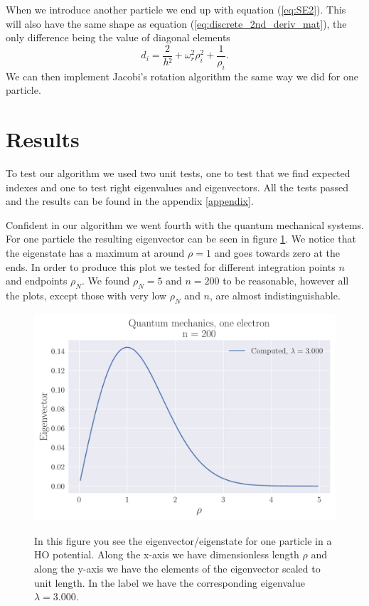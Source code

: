 \documentclass[reprint,english,notitlepage,nofootinbib]{revtex4-1}  %
\begin{document}
When we introduce another particle we end up with equation (\ref{eq:SE2}). This will also have the same shape as equation (\ref{eq:discrete_2nd_deriv_mat}), the only difference being the value of diagonal elements
\begin{equation*}
	d_i = \frac{2}{h²} + \omega_r^2\rho_i^2 + \frac{1}{\rho_i}.
\end{equation*}
We can then implement Jacobi's rotation algorithm the same way we did for one particle.

\section{Results}

To test our algorithm we used two unit tests, one to test that we find expected indexes and one to test right eigenvalues and eigenvectors. All the tests passed and the results can be found in the appendix \ref{appendix}. 

Confident in our algorithm we went fourth with the quantum mechanical systems. For one particle the resulting eigenvector can be seen in figure \ref{fig:QM200}. We notice that the eigenstate has a maximum at around $\rho = 1$ and goes towards zero at the ends. In order to produce this plot we tested for different integration points $n$ and endpoints $\rho_N$. We found $\rho_N= 5$ and $n=200$ to be reasonable, however all the plots, except those with very low $\rho_N$ and $n$, are almost indistinguishable.

\begin{figure}[h]
	\centering
	\includegraphics[width=\linewidth]{../output/QM1_200_0.pdf}
	\label{fig:QM200}
	\caption{In this figure you see the eigenvector/eigenstate for one particle in a HO potential. Along the x-axis we have dimensionless length $\rho$ and along the y-axis we have the elements of the eigenvector scaled to unit length. In the label we have the corresponding eigenvalue $\lambda = 3.000$.}
\end{figure}
\end{document}
